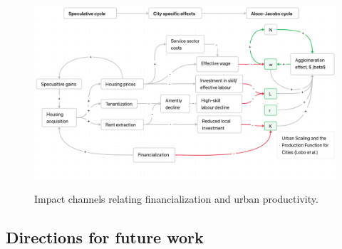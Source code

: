 






{\newpage\thispagestyle{empty}
\vspace{-1.5cm}
\begin{figure}[h!tb]
\vspace{-1cm}
\begin{adjustwidth}{-0.24\textwidth}{-0.24\textwidth}
\centering
\includegraphics[scale=.35, angle=90]{fig/impact-channels.png}
\label{fig-impact-channels}
\end{adjustwidth}
\caption{Impact channels relating financialization and urban productivity.}
\end{figure}
}

\subsection{Directions for future work}

